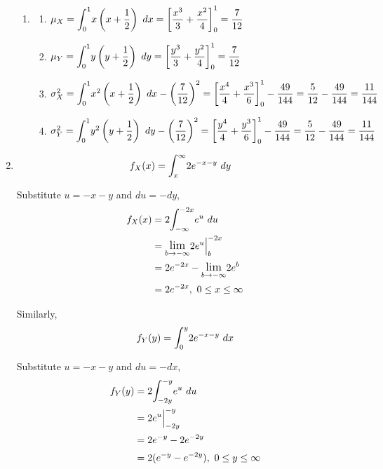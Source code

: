 \documentclass{article}
\newcommand\mfrac[2]{\left(\dfrac{#1}{#2}\right)}
\newcommand\lint{\mathlarger{\int}}
\begin{document}
\begin{enumerate}
\begin{enumerate}
       \item
	\begin{enumerate}
	 \item 
	  $\mu_X = \lint_0^1 {x \left(x + \dfrac{1}{2}\right)\ dx} = 
	    \left[\dfrac{x^3}{3} + \dfrac{x^2}{4}\right]_0^1 = \dfrac{7}{12}$
	 
	 \item
	  $\mu_Y = \lint_0^1 {y \left(y + \dfrac{1}{2}\right)\ dy} = 
	    \left[\dfrac{y^3}{3} + \dfrac{y^2}{4}\right]_0^1 = \dfrac{7}{12}$
	 
	 \item
	  $\sigma_X^2 = \lint_0^1 {x^2 \left(x+\dfrac{1}{2}\right)\ dx} - \mfrac{7}{12}^2 = 
	    \left[\dfrac{x^4}{4} + \dfrac{x^3}{6}\right]_0^1 - \dfrac{49}{144} = 
	    \dfrac{5}{12} - \dfrac{49}{144} = \dfrac{11}{144}$
	 
	 \item
	  $\sigma_Y^2 = \lint_0^1 {y^2 \left(y+\dfrac{1}{2}\right)\ dy} - \mfrac{7}{12}^2 = 
	    \left[\dfrac{y^4}{4} + \dfrac{y^3}{6}\right]_0^1 - \dfrac{49}{144} = 
	    \dfrac{5}{12} - \dfrac{49}{144} = \dfrac{11}{144}$
	\end{enumerate}
      \end{enumerate}
     
     \item
      \begin{align*}
	f_X(x) &= \lint_x^\infty{2e^{-x-y}\ dy}
      \end{align*}
      
      Substitute $u = -x - y$ and $du = -dy$,
      \begin{align*}
       f_X(x) &= 2\lint_{-\infty}^{-2x}{e^u\ du} \\
	&= \mathlarger{\lim}_{b \to -\infty} 2e^u \Big|_b^{-2x} \\
	&= 2e^{-2x} - \mathlarger{\lim}_{b \to -\infty} 2e^b \\
	&= 2e^{-2x},\ 0 \le x \le \infty
      \end{align*}
      
      Similarly,
      \begin{align*}
       f_Y(y) = \lint_0^y {2e^{-x-y}\ dx}
      \end{align*}
      
      Substitute $u = -x - y$ and $du = -dx$,
      \begin{align*}
       f_Y(y) &= 2\lint_{-2y}^{-y}{e^u\ du} \\
	&= 2e^u \Big|_{-2y}^{-y} \\
	&= 2e^{-y} - 2e^{-2y} \\
	&= 2(e^{-y} - e^{-2y}),\ 0 \le y \le \infty
      \end{align*}
      

\end{enumerate}
\end{document}
